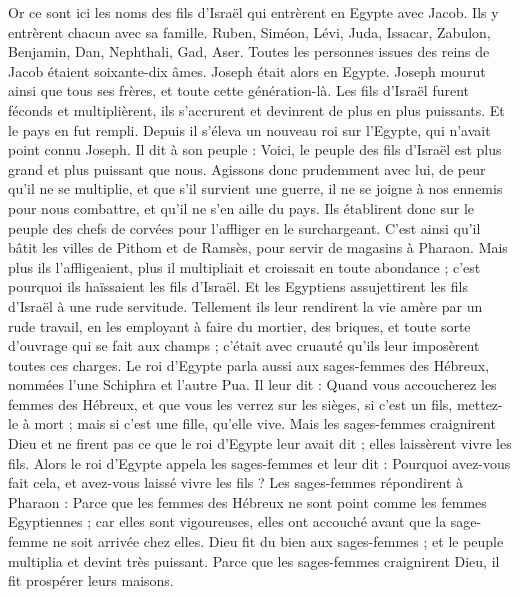 \begin{multicols}{2}
\VerseOne{}Or ce sont ici les noms des fils d'Israël qui entrèrent en Egypte avec Jacob. Ils y entrèrent chacun avec sa famille.
Ruben, Siméon, Lévi, Juda,
Issacar, Zabulon, Benjamin,
Dan, Nephthali, Gad, Aser.
Toutes les personnes issues des reins de Jacob étaient soixante-dix âmes. Joseph était alors en Egypte.
Joseph mourut ainsi que tous ses frères, et toute cette génération-là.
Les fils d'Israël furent féconds et multiplièrent, ils s’accrurent et devinrent de plus en plus puissants. Et le pays en fut rempli\FTNT{}.
Depuis il s'éleva un nouveau roi sur l'Egypte, qui n'avait point connu Joseph.
Il dit à son peuple : Voici, le peuple des fils d'Israël est plus grand et plus puissant que nous.
Agissons donc prudemment avec lui, de peur qu'il ne se multiplie, et que s'il survient une guerre, il ne se joigne à nos ennemis pour nous combattre, et qu'il ne s'en aille du pays.
Ils établirent donc sur le peuple des chefs de corvées pour l'affliger en le surchargeant. C’est ainsi qu’il bâtit les villes de Pithom et de Ramsès, pour servir de magasins à Pharaon.
Mais plus ils l'affligeaient, plus il multipliait et croissait en toute abondance ; c'est pourquoi ils haïssaient les fils d'Israël\FTNT{}.
Et les Egyptiens assujettirent les fils d’Israël à une rude servitude\FTNT{}.
Tellement ils leur rendirent la vie amère par un rude travail, en les employant à faire du mortier, des briques, et toute sorte d'ouvrage qui se fait aux champs ; c’était avec cruauté qu’ils leur imposèrent toutes ces charges.
Le roi d'Egypte parla aussi aux sages-femmes des Hébreux, nommées l’une Schiphra et l’autre Pua.
Il leur dit : Quand vous accoucherez les femmes des Hébreux, et que vous les verrez sur les sièges, si c'est un fils, mettez-le à mort ; mais si c'est une fille, qu'elle vive.
Mais les sages-femmes craignirent Dieu et ne firent pas ce que le roi d'Egypte leur avait dit ; elles laissèrent vivre les fils.
Alors le roi d'Egypte appela les sages-femmes et leur dit : Pourquoi avez-vous fait cela, et avez-vous laissé vivre les fils ?
Les sages-femmes répondirent à Pharaon : Parce que les femmes des Hébreux ne sont point comme les femmes Egyptiennes ; car elles sont vigoureuses, elles ont accouché avant que la sage-femme ne soit arrivée chez elles.
Dieu fit du bien aux sages-femmes ; et le peuple multiplia et devint très puissant.
Parce que les sages-femmes craignirent Dieu, il fit prospérer leurs maisons.

\end{multicols}
